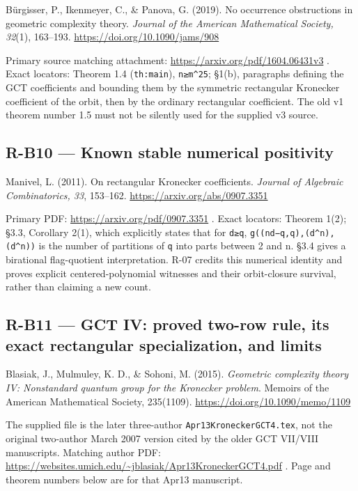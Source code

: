 \documentclass[11pt,a4paper]{article}
\theoremstyle{definition}\newtheorem{definition}{Definition}
\begin{document}
Bürgisser, P., Ikenmeyer, C., \& Panova, G. (2019). No occurrence
obstructions in geometric complexity theory. \emph{Journal of the
American Mathematical Society, 32}(1), 163--193.
\url{https://doi.org/10.1090/jams/908}

Primary source matching attachment:
\url{https://arxiv.org/pdf/1604.06431v3} . Exact locators: Theorem 1.4
(\nolinkurl{th:main}), \texttt{n≥m\^{}25}; §1(b), paragraphs defining the
GCT coefficients and bounding them by the symmetric rectangular
Kronecker coefficient of the orbit, then by the ordinary rectangular
coefficient. The old v1 theorem number 1.5 must not be silently used for
the supplied v3 source.

\subsection{R-B10 --- Known stable numerical
positivity}\label{r-b10--known-stable-numerical-positivity}

Manivel, L. (2011). On rectangular Kronecker coefficients. \emph{Journal
of Algebraic Combinatorics, 33}, 153--162.
\url{https://arxiv.org/abs/0907.3351}

Primary PDF: \url{https://arxiv.org/pdf/0907.3351} . Exact locators:
Theorem 1(2); §3.3, Corollary 2(1), which explicitly states that for
\nolinkurl{d≥q}, \texttt{g((nd−q,q),(d\^{}n),(d\^{}n))} is the number of
partitions of \nolinkurl{q} into parts between 2 and n. §3.4 gives a
birational flag-quotient interpretation. R-07 credits this numerical
identity and proves explicit centered-polynomial witnesses and their
orbit-closure survival, rather than claiming a new count.

\subsection{R-B11 --- GCT IV: proved two-row rule, its exact rectangular
specialization, and
limits}\label{r-b11--gct-iv-proved-two-row-rule-its-exact-rectangular-specialization-and-limits}

Blasiak, J., Mulmuley, K. D., \& Sohoni, M. (2015). \emph{Geometric
complexity theory IV: Nonstandard quantum group for the Kronecker
problem}. Memoirs of the American Mathematical Society, 235(1109).
\url{https://doi.org/10.1090/memo/1109}

The supplied file is the later three-author
\nolinkurl{Apr13KroneckerGCT4.tex}, not the original two-author March 2007
version cited by the older GCT VII/VIII manuscripts. Matching author
PDF: \url{https://websites.umich.edu/~jblasiak/Apr13KroneckerGCT4.pdf} .
Page and theorem numbers below are for that Apr13 manuscript.
\end{document}
